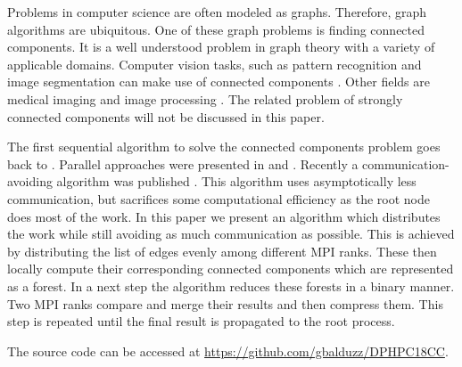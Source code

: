 

Problems in computer science are often modeled as graphs. Therefore, graph algorithms are
ubiquitous. One of these graph problems is finding connected components. It is a well understood
problem in graph theory with a variety of applicable domains. Computer vision tasks, such as
pattern recognition and image segmentation \cite{683775} can make use of connected components
\cite{Wilson:2006:RCV:1166253.1166292}. Other fields are medical imaging \cite{UDUPA1990355} and
image processing \cite{Ambrosio2001}. The related problem of strongly connected components will not
be discussed in this paper.

The first sequential algorithm to solve the connected components problem goes back to
\cite{Hopcroft}. Parallel approaches were presented in \cite{MANOHAR1989133} and
\cite{Han:1990:EFP:79147.214077}. Recently a communication-avoiding algorithm was published \cite{comm_avoiding}.
This algorithm uses asymptotically less communication, but sacrifices some computational
efficiency as the root node does most of the work. In this paper we present an algorithm which
distributes the work while still avoiding as much communication as possible. This is achieved by
distributing the list of edges evenly among different MPI ranks. These then locally compute their
corresponding connected components which are represented as a forest. In a next step the algorithm
reduces these forests in a binary manner. Two MPI ranks compare and merge their results and then
compress them. This step is repeated until the final result is propagated to the root process.

The source code can be accessed at \url{ https://github.com/gbalduzz/DPHPC18CC}.


